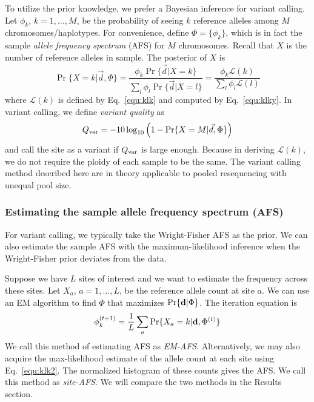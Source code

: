 \documentclass{bioinfo}
\begin{document}
\begin{methods}
To utilize the prior knowledge, we prefer a Bayesian inference for variant
calling.  Let $\phi_k$, $k=1,\ldots,M$, be the probability of seeing $k$
reference alleles among $M$ chromosomes/haplotypes. For convenience, define
$\Phi=\{\phi_k\}$, which is in fact the sample \emph{allele frequency spectrum}
(AFS) for $M$ chromosomes. Recall that $X$ is the number of reference alleles
in sample. The posterior of $X$ is
\begin{equation}\label{eq:post}
\Pr\{X=k|\vec{d},\Phi\}=\frac{\phi_k\Pr\{\vec{d}|X=k\}}{\sum_l\phi_l\Pr\{\vec{d}|X=l\}}
=\frac{\phi_k\mathcal{L}(k)}{\sum_l\phi_l\mathcal{L}(l)}
\end{equation}
where $\mathcal{L}(k)$ is defined by Eq.~\eqref{equ:klk} and computed by
Eq.~\eqref{equ:klky}.  In variant calling, we define \emph{variant quality} as
$$
Q_{\rm var}=-10\log_{10}\Big(1-\Pr\{X=M|\vec{d},\Phi\}\Big)
$$
and call the site as a variant if $Q_{\rm var}$ is large enough. Because in
deriving $\mathcal{L}(k)$, we do not require the ploidy of each sample to be
the same. The variant calling method described here are in theory applicable to
pooled resequencing with unequal pool size.

\subsubsection{Estimating the sample allele frequency spectrum (AFS)}
For variant calling, we typically take the Wright-Fisher AFS as the prior. We
can also estimate the sample AFS with the maximum-likelihood inference when the
Wright-Fisher prior deviates from the data.

Suppose we have $L$ sites of interest and we want to estimate the frequency
across these sites.  Let $X_a$, $a=1,\ldots,L$, be the reference allele count
at site $a$. We can use an EM algorithm to find $\Phi$ that maximizes
$\Pr\{{\bf d}|\Phi\}$. The iteration equation is
\begin{equation}\label{eq:afs}
\phi_k^{(t+1)}=\frac{1}{L}\sum_a\Pr\{X_a=k|{\bf d},\Phi^{(t)}\}
\end{equation}
We call this method of estimating AFS as \emph{EM-AFS}. Alternatively, we may
also acquire the max-likelihood estimate of the allele count at each site using
Eq.~\eqref{equ:klk2}. The normalized histogram of these counts gives the AFS.
We call this method as \emph{site-AFS}. We will compare the two methods in the
Results section.


\end{methods}
\end{document}
